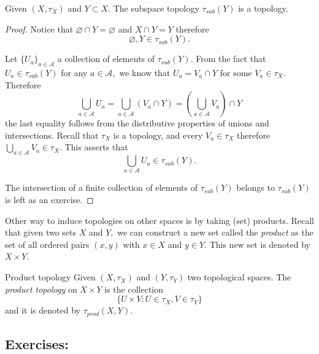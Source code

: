 \documentclass[
	fontsize=10pt, %
	twoside=false, %
	secnumdepth=1, %
]{kaobook}
\begin{document}
\begin{lemma}
Given $(X,\tau_X)$ and $Y\subset X.$ The subspace topology $\tau_{sub}(Y)$ is a topology.
\end{lemma}
\begin{proof}
\item Notice that $\varnothing\cap Y=\varnothing$ and $X\cap Y=Y$ therefore $$\varnothing,Y\in \tau_{sub}(Y).$$

\item Let $\{U_a\}_{a\in\mathcal{A}}$ a collection of elements of $\tau_{sub}(Y).$ From the fact that $U_a\in \tau_{sub}(Y)$ for any $a\in\mathcal{A},$ we know that $U_a=V_a\cap Y$ for some $V_a\in \tau_X.$ Therefore $$\bigcup_{a\in\mathcal{A}} U_a =\bigcup_{a\in \mathcal{A}} (V_a\cap Y) = \left(\bigcup_{a\in \mathcal{A}} V_a \right)\cap Y$$ the last equality follows from the distributive properties of unions and intersections. Recall that $\tau_X$ is a topology, and every $V_a\in \tau_X$ therefore $\bigcup_{a\in\mathcal{A}}V_a\in \tau_X.$ This asserts that $$\bigcup_{a\in\mathcal{A}}U_a\in \tau_{sub}(Y).$$

The intersection of a finite collection of elements of $\tau_{sub}(Y)$ belongs to $\tau_{sub}(Y)$ is left as an exercise.
\end{proof}

Other way to induce topologies on other spaces is by taking (set) products. Recall that given two sets $X$ and $Y,$ we can construct a new set called the \emph{product} as the set of all ordered pairs $(x,y)$ with $x\in X$ and $y\in Y.$ This new set is denoted by $X\times Y.$

\begin{definition}{Product topology}
Given $(X,\tau_X)$ and $(Y,\tau_Y)$ two topological spaces. The \emph{product topology} on $X\times Y$ is the collection $$\{U\times V: U\in \tau_X, V\in \tau_Y\}$$ and it is denoted by $\tau_{prod}(X,Y).$
\end{definition}


\subsection{Exercises:}
\end{document}
